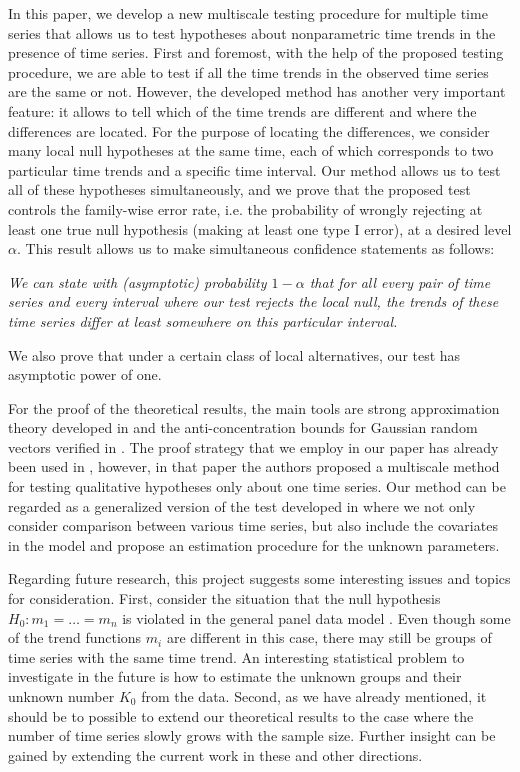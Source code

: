 \documentclass[a4paper,12pt]{article}
\makeatletter
\renewcommand{\eqref}[1]{\tagform@{\ref{#1}}}
\makeatother
\begin{document}
In this paper, we develop a new multiscale testing procedure for multiple time series that allows us to test hypotheses about nonparametric time trends in the presence of time series. First and foremost, with the help of the proposed testing procedure, we are able to test if all the time trends in the observed time series are the same or not. However, the developed method has another very important feature: it allows to tell which of the time trends are different and where the differences are located. For the purpose of locating the differences, we consider many local null hypotheses at the same time, each of which corresponds to two particular time trends and a specific time interval. Our method allows us to test all of these hypotheses simultaneously, and we prove that the proposed test controls the family-wise error rate, i.e. the probability of wrongly rejecting at least one true null hypothesis (making at least one type I error), at a desired level $\alpha$. This result allows us to make simultaneous confidence statements as follows: 

\begin{center}
\begin{minipage}[c][1.75cm][c]{14cm}
\textit{We can state with (asymptotic) probability $1-\alpha$ that for all every pair of time series and every interval where our test rejects the local null, the trends of these time series differ at least somewhere on this particular interval.}
\end{minipage}
\end{center}

We also prove that under a certain class of local alternatives, our test has asymptotic power of one.

For the proof of the theoretical results, the main tools are strong approximation theory developed in \cite{BerkesLiuWu2014} and the anti-concentration bounds for Gaussian random vectors verified in \cite{Chernozhukov2015}. The proof strategy that we employ in our paper has already been used in \cite{KhismatullinaVogt2020}, however, in that paper the authors proposed a multiscale method for testing qualitative hypotheses only about one time series. Our method can be regarded as a generalized version of the test developed in \cite{KhismatullinaVogt2020} where we not only consider comparison between various time series, but also include the covariates in the model and propose an estimation procedure for the unknown parameters.

Regarding future research, this project suggests some interesting issues and topics for consideration. First, consider the situation that the null hypothesis $H_0: m_1 = \ldots = m_n$ is violated in the general panel data model \eqref{eq:model}. Even though some of the trend functions $m_i$ are different in this case, there may still be groups of time series with the same time trend. An interesting statistical problem to investigate in the future is how to estimate the unknown groups and their unknown number $K_0$ from the data. Second, as we have already mentioned, it should be to possible to extend our theoretical results to the case where the number of time series slowly grows with the sample size. Further insight can be gained by extending the current work in these and other directions.
\end{document}
